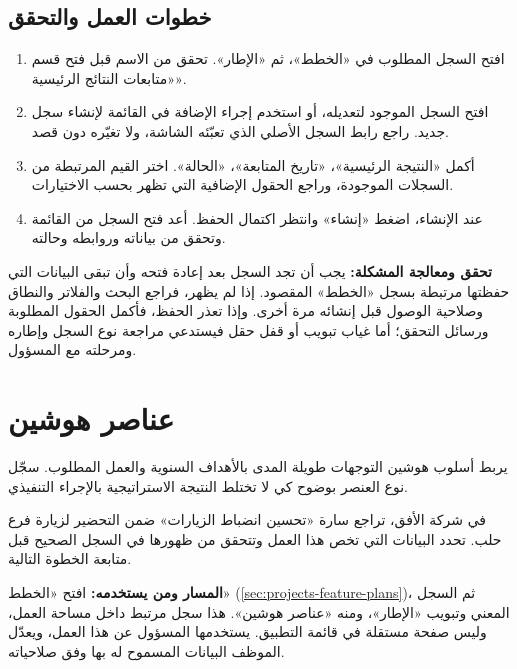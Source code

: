 \subsection{خطوات العمل والتحقق}
\begin{enumerate}
\item افتح السجل المطلوب في «الخطط»، ثم «الإطار». تحقق من الاسم قبل فتح قسم «متابعات النتائج الرئيسية».
\item افتح السجل الموجود لتعديله، أو استخدم إجراء الإضافة في القائمة لإنشاء سجل جديد. راجع رابط السجل الأصلي الذي تعبّئه الشاشة، ولا تغيّره دون قصد.
\item أكمل «النتيجة الرئيسية»، «تاريخ المتابعة»، «الحالة». اختر القيم المرتبطة من السجلات الموجودة، وراجع الحقول الإضافية التي تظهر بحسب الاختيارات.
\item عند الإنشاء، اضغط «إنشاء» وانتظر اكتمال الحفظ. أعد فتح السجل من القائمة وتحقق من بياناته وروابطه وحالته.
\end{enumerate}

\textbf{تحقق ومعالجة المشكلة:} يجب أن تجد السجل بعد إعادة فتحه وأن تبقى البيانات التي حفظتها مرتبطة بسجل «الخطط» المقصود. إذا لم يظهر، فراجع البحث والفلاتر والنطاق وصلاحية الوصول قبل إنشائه مرة أخرى. وإذا تعذر الحفظ، فأكمل الحقول المطلوبة ورسائل التحقق؛ أما غياب تبويب أو قفل حقل فيستدعي مراجعة نوع السجل وإطاره ومرحلته مع المسؤول.

\clearpage
\section{عناصر هوشين}
\label{sec:projects-feature-planning-hoshin-items}

يربط أسلوب هوشين التوجهات طويلة المدى بالأهداف السنوية والعمل المطلوب. سجّل نوع العنصر بوضوح كي لا تختلط النتيجة الاستراتيجية بالإجراء التنفيذي.

\begin{rcnote}
في شركة الأفق، تراجع سارة «تحسين انضباط الزيارات» ضمن التحضير لزيارة فرع حلب. تحدد البيانات التي تخص هذا العمل وتتحقق من ظهورها في السجل الصحيح قبل متابعة الخطوة التالية.
\end{rcnote}

\textbf{المسار ومن يستخدمه:} افتح «الخطط» (\ref{sec:projects-feature-plans})، ثم السجل المعني وتبويب «الإطار»، ومنه «عناصر هوشين». هذا سجل مرتبط داخل مساحة العمل، وليس صفحة مستقلة في قائمة التطبيق. يستخدمها المسؤول عن هذا العمل، ويعدّل الموظف البيانات المسموح له بها وفق صلاحياته.

